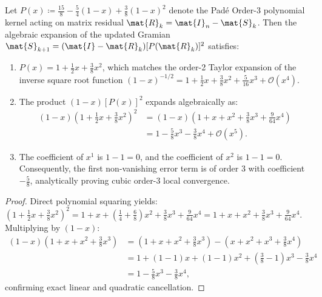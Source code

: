 \begin{lemma}
\label{lem:pade_order_3_stiefel}
Let $P(x) \coloneqq \frac{15}{8} - \frac{5}{4}(1 - x) + \frac{3}{8}(1 - x)^2$ denote the Pad\'e Order-3 polynomial kernel acting on matrix residual $\mat{R}_k = \mat{I}_n - \mat{S}_k$.
Then the algebraic expansion of the updated Gramian $\mat{S}_{k+1} = (\mat{I} - \mat{R}_k) [P(\mat{R}_k)]^2$ satisfies:
\begin{enumerate}
    \item $P(x) = 1 + \frac{1}{2}x + \frac{3}{8}x^2$, which matches the order-2 Taylor expansion of the inverse square root function $(1 - x)^{-1/2} = 1 + \frac{1}{2}x + \frac{3}{8}x^2 + \frac{5}{16}x^3 + \mathcal{O}(x^4)$.
    \item The product $(1 - x)[P(x)]^2$ expands algebraically as:
    \begin{align}
    (1 - x) \left( 1 + \frac{1}{2}x + \frac{3}{8}x^2 \right)^2 &= (1 - x) \left( 1 + x + x^2 + \frac{3}{8}x^3 + \frac{9}{64}x^4 \right) \nonumber \\
    &= 1 - \frac{5}{8}x^3 - \frac{3}{8}x^4 + \mathcal{O}(x^5).
    \label{eq:pade_cancellation_explicit}
    \end{align}
    \item The coefficient of $x^1$ is $1 - 1 = 0$, and the coefficient of $x^2$ is $1 - 1 = 0$.
    Consequently, the first non-vanishing error term is of order 3 with coefficient $-\frac{5}{8}$, analytically proving cubic order-3 local convergence.
\end{enumerate}
\end{lemma}

\begin{proof}
Direct polynomial squaring yields:
$(1 + \frac{1}{2}x + \frac{3}{8}x^2)^2 = 1 + x + (\frac{1}{4} + \frac{6}{8})x^2 + \frac{3}{8}x^3 + \frac{9}{64}x^4 = 1 + x + x^2 + \frac{3}{8}x^3 + \frac{9}{64}x^4$.
Multiplying by $(1 - x)$:
\begin{align}
(1 - x)(1 + x + x^2 + \frac{3}{8}x^3) &= (1 + x + x^2 + \frac{3}{8}x^3) - (x + x^2 + x^3 + \frac{3}{8}x^4) \nonumber \\
&= 1 + (1 - 1)x + (1 - 1)x^2 + \left(\frac{3}{8} - 1\right)x^3 - \frac{3}{8}x^4 \nonumber \\
&= 1 - \frac{5}{8}x^3 - \frac{3}{8}x^4,
\end{align}
confirming exact linear and quadratic cancellation.
\end{proof}

